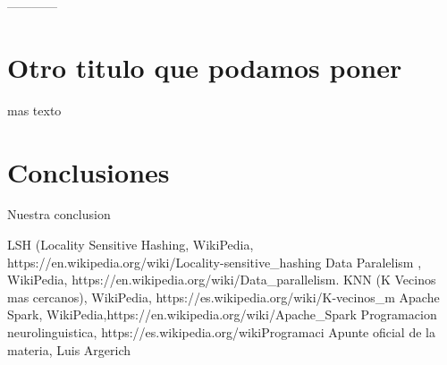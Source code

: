 \documentclass[a4paper,10pt]{article}
\begin{document}
	------------

	
	\section{Otro titulo que podamos poner}
	
	mas texto
	
	\section{Conclusiones}
	
	Nuestra conclusion
	
	\begin{thebibliography}{99}
		 LSH (Locality Sensitive Hashing, WikiPedia, https://en.wikipedia.org/wiki/Locality-sensitive_hashing
		 Data Paralelism , WikiPedia, https://en.wikipedia.org/wiki/Data_parallelism.
		 KNN (K Vecinos mas cercanos), WikiPedia, https://es.wikipedia.org/wiki/K-vecinos_m%
		 Apache Spark, WikiPedia,https://en.wikipedia.org/wiki/Apache_Spark
		 Programacion neurolinguistica, https://es.wikipedia.org/wikiProgramaci%
		 Apunte oficial de la materia, Luis Argerich

	\end{thebibliography}
	
\end{document}
